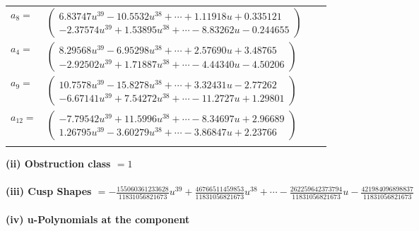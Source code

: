 \documentclass[1p]{elsarticle_modified}
\theoremstyle{definition}
\begin{document}
\begin{tabular}{m{7pt} m{180pt} m{7pt} m{180pt} }
\flushright $a_{8}=$&$\begin{pmatrix}6.83747 u^{39}-10.5532 u^{38}+\cdots+1.11918 u+0.335121\\-2.37574 u^{39}+1.53895 u^{38}+\cdots-8.83262 u-0.244655\end{pmatrix}$ \\
\flushright $a_{4}=$&$\begin{pmatrix}8.29568 u^{39}-6.95298 u^{38}+\cdots+2.57690 u+3.48765\\-2.92502 u^{39}+1.71887 u^{38}+\cdots-4.44340 u-4.50206\end{pmatrix}$ \\
\flushright $a_{9}=$&$\begin{pmatrix}10.7578 u^{39}-15.8278 u^{38}+\cdots+3.32431 u-2.77262\\-6.67141 u^{39}+7.54272 u^{38}+\cdots-11.2727 u+1.29801\end{pmatrix}$ \\
\flushright $a_{12}=$&$\begin{pmatrix}-7.79542 u^{39}+11.5996 u^{38}+\cdots-8.34697 u+2.96689\\1.26795 u^{39}-3.60279 u^{38}+\cdots-3.86847 u+2.23766\end{pmatrix}$\\&\end{tabular}
\flushleft \textbf{(ii) Obstruction class $= 1$}\\~\\
\flushleft \textbf{(iii) Cusp Shapes $= -\frac{155060361233628}{11831056821673} u^{39}+\frac{46766511459853}{11831056821673} u^{38}+\cdots-\frac{262259642373794}{11831056821673} u-\frac{421984096898837}{11831056821673}$}\\~\\
\newpage\renewcommand{\arraystretch}{1}
\flushleft \textbf{(iv) u-Polynomials at the component}\newline \\
\end{document}
